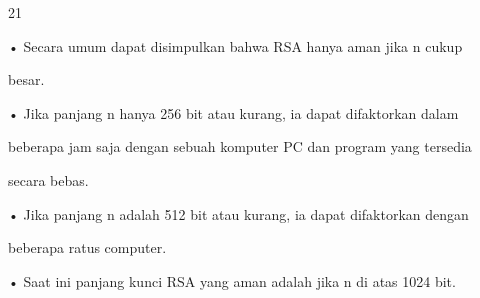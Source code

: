 \documentclass{article}
\begin{document}

21

• Secara umum dapat disimpulkan bahwa RSA hanya aman jika n cukup 

besar.

• Jika panjang n hanya 256 bit atau kurang, ia dapat difaktorkan dalam 

beberapa jam saja dengan sebuah komputer PC dan program yang tersedia 

secara bebas. 

• Jika panjang n adalah 512 bit atau kurang, ia dapat difaktorkan dengan 

beberapa ratus computer.

• Saat ini panjang kunci RSA yang aman adalah jika n di atas 1024 bit.
\end{document}
